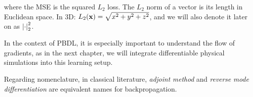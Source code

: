 where the \acf{MSE} is the squared $L_2$ loss. The $L_2$ norm of a vector is its
length in Euclidean space. In 3D: $L_2(\vb{x}) = \sqrt{x^2 + y^2 + z^2}$, and we
will also denote it later on as $\abs{\cdot}_2^2$.

In the context of \acf{PBDL}, it is especially important to understand the flow
of gradients, as in the next chapter, we will integrate differentiable physical
simulations into this learning setup.

Regarding nomenclature, in classical literature, \textit{adjoint method} and
\textit{reverse mode differentiation} are equivalent names for backpropagation.





